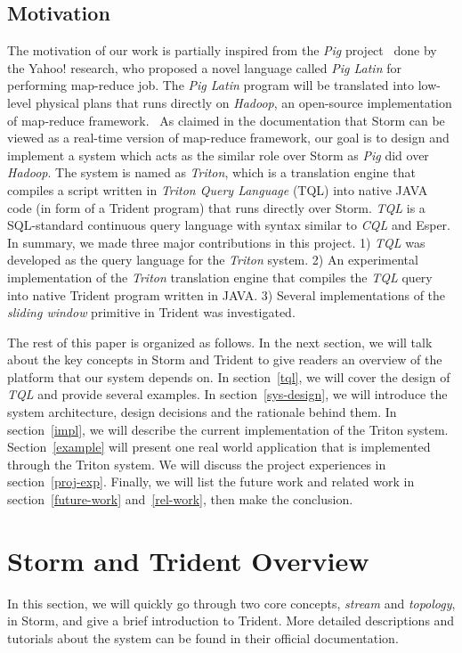\documentclass[conference, twocolumn, 11pt]{IEEEtran}
\theoremstyle{definition}
\begin{document}
\subsection{Motivation}
The motivation of our work is partially inspired from the \emph{Pig} project~\cite{ORS+08} done by the Yahoo! research, who proposed a novel language called \emph{Pig Latin} for performing map-reduce job. The \emph{Pig Latin} program will be translated into low-level physical plans that runs directly on \emph{Hadoop}, an open-source implementation of map-reduce framework.~\cite{hadoop} As claimed in the documentation that Storm can be viewed as a real-time version of map-reduce framework, our goal is to design and implement a system which acts as the similar role over Storm as \emph{Pig} did over \emph{Hadoop}. The system is named as \emph{Triton}, which is a translation engine that compiles a script written in \emph{Triton Query Language} (TQL) into native JAVA code (in form of a Trident program) that runs directly over Storm. \emph{TQL} is a SQL-standard continuous query language with syntax similar to \emph{CQL} and Esper.
In summary, we made three major contributions in this project. 1) \emph{TQL} was developed as the query language for the \emph{Triton} system. 2) An experimental implementation of the \emph{Triton} translation engine that compiles the \emph{TQL} query into native Trident program written in JAVA. 3) Several implementations of the \emph{sliding window} primitive in Trident was investigated.

The rest of this paper is organized as follows. In the next section, we will talk about the key concepts in Storm and Trident to give readers an overview of the platform that our system depends on. In section~\ref{tql}, we will cover the design of \emph{TQL} and provide several examples. In section~\ref{sys-design}, we will introduce the system architecture, design decisions and the rationale behind them.
In section~\ref{impl}, we will describe the current implementation of the Triton system. Section~\ref{example} will present one real world application that is implemented through the Triton system. We will discuss the project experiences in section~\ref{proj-exp}.
Finally, we will list the future work and related work in section~\ref{future-work} and~\ref{rel-work}, then make the conclusion.


\section{Storm and Trident Overview}\label{storm-trident}
In this section, we will quickly go through two core concepts, \emph{stream} and \emph{topology}, in Storm, and give a brief introduction to Trident. More detailed descriptions and tutorials about the system can be found in their official documentation.~\cite{Storm}
\end{document}

